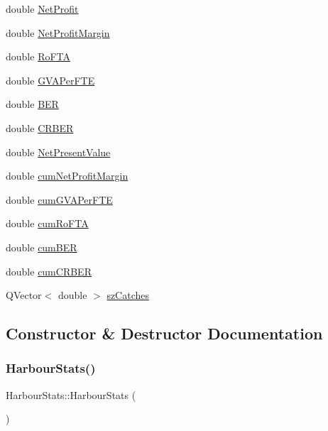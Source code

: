\begin{DoxyCompactItemize}
double \mbox{\hyperlink{class_harbour_stats_a7bc051780356ccacdbe82aaebadff903}{Net\+Profit}}
\item 
double \mbox{\hyperlink{class_harbour_stats_ae55537444e389963e147224706df06e1}{Net\+Profit\+Margin}}
\item 
double \mbox{\hyperlink{class_harbour_stats_aae59a95759763f6a43d38ac95c75ebb9}{Ro\+F\+TA}}
\item 
double \mbox{\hyperlink{class_harbour_stats_a46103e2f90bfbbd9e76b671d84d3a3ef}{G\+V\+A\+Per\+F\+TE}}
\item 
double \mbox{\hyperlink{class_harbour_stats_a8c230a8f7c204c05140ff16473b41fb3}{B\+ER}}
\item 
double \mbox{\hyperlink{class_harbour_stats_a349ceb15b5a2dd5c6a4617ec1a9cea56}{C\+R\+B\+ER}}
\item 
double \mbox{\hyperlink{class_harbour_stats_a5a80149955d0981fc8c50c64a0062774}{Net\+Present\+Value}}
\item 
double \mbox{\hyperlink{class_harbour_stats_adc1d7a7ab6f4d0da0e608b842c70382e}{cum\+Net\+Profit\+Margin}}
\item 
double \mbox{\hyperlink{class_harbour_stats_a6fadc4c3304fea714a380a74a6f93e5d}{cum\+G\+V\+A\+Per\+F\+TE}}
\item 
double \mbox{\hyperlink{class_harbour_stats_a31e9bed4592f256b2f7a9e49f40de2bc}{cum\+Ro\+F\+TA}}
\item 
double \mbox{\hyperlink{class_harbour_stats_a3c895082e80cc6dc05a928f3fe97062f}{cum\+B\+ER}}
\item 
double \mbox{\hyperlink{class_harbour_stats_a1b8ad82068236b179e2158c20a36082e}{cum\+C\+R\+B\+ER}}
\item 
Q\+Vector$<$ double $>$ \mbox{\hyperlink{class_harbour_stats_a7e13b0dd63ad9bb61fd428dfac8111f5}{sz\+Catches}}
\end{DoxyCompactItemize}


\subsection{Constructor \& Destructor Documentation}
\mbox{\label{class_harbour_stats_aa523ef633e9af7cc6830b08afa79eca8}} 
\subsubsection{\texorpdfstring{HarbourStats()}{HarbourStats()}}
{\footnotesize\ttfamily Harbour\+Stats\+::\+Harbour\+Stats (\begin{DoxyParamCaption}{ }\end{DoxyParamCaption})}



